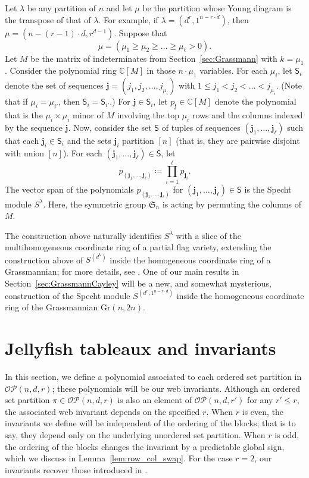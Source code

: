 \documentclass[ALCO, Unicode]{cedram}
\numberwithin{equation}{section}
\newcommand{\Gr}{\mathrm{Gr}}
\newcommand{\ordsetpart}{\mathcal{OP}}
\begin{document}
Let $\lambda$ be any partition of $n$ and let $\mu$ be the partition whose Young diagram is the transpose of that of $\lambda$. For example, if $\lambda = (d^r,1^{n - r \cdot d})$, then $\mu  = (n - (r-1) \cdot d, r^{d-1})$. Suppose that 
\[
\mu = (\mu_1 \geq \mu_2 \geq \dots \geq \mu_\ell > 0).
\]
Let $M$ be the matrix of indeterminates from Section~\ref{sec:Grassmann} with $k = \mu_1$. Consider the polynomial ring $\mathbb{C}[M]$ in those $n \cdot \mu_1$ variables. For each $\mu_i$, let $\mathsf{S}_i$ denote the set of sequences $\mathbf{j} = (j_1, j_2, \dots, j_{\mu_i})$ with $1 \leq j_1 < j_2 < \dots < j_{\mu_i}$. (Note that if $\mu_i = \mu_{i'}$, then $\mathsf{S}_i = \mathsf{S}_{i'}$.) For $\mathbf{j} \in \mathsf{S}_i$, let $p_{\mathbf{j}} \in \mathbb{C}[M]$ denote the polynomial that is the $\mu_i \times \mu_i$ minor of $M$ involving the top $\mu_i$ rows and the columns indexed by the sequence $\mathbf{j}$. Now, consider the set $\mathsf{S}$ of tuples of sequences $(\mathbf{j}_1, \dots, \mathbf{j}_\ell)$ such that each $\mathbf{j}_i \in \mathsf{S}_i$ and the sets $\mathbf{j}_i$ partition $[n]$ (that is, they are pairwise disjoint with union $[n]$).
For each $(\mathbf{j}_1, \dots, \mathbf{j}_\ell) \in \mathsf{S}$, let \[
p_{(\mathbf{j}_1, \dots, \mathbf{j}_\ell)} \coloneqq \prod_{i=1}^\ell p_{\mathbf{j}_i}.
\]
The vector span of the polynomials $p_{(\mathbf{j}_1, \dots, \mathbf{j}_\ell)}$ for $(\mathbf{j}_1, \dots, \mathbf{j}_\ell) \in \mathsf{S}$ is the Specht module $S^\lambda$. Here, the symmetric group $\mathfrak{S}_n$ is acting by permuting the columns of $M$.

The construction above naturally identifies $S^\lambda$ with a slice of the multihomogeneous coordinate ring of a partial flag variety, extending the construction above of $S^{(d^k)}$ inside the homogeneous coordinate ring of a Grassmannian; for more details, see \cite[\S2.3]{Patrias.Pechenik.Striker}.
One of our main results in Section~\ref{sec:GrassmannCayley} will be a new, and somewhat mysterious, construction of the Specht module $S^{(d^r,1^{n-r\cdot d})}$ inside the homogeneous coordinate ring of the Grassmannian $\Gr(n,2n)$.

\section{Jellyfish tableaux and  invariants}
\label{sec:invariants}
In this section, we define a polynomial associated to each ordered set partition in $\ordsetpart(n,d,r)$; these polynomials will be our web invariants. Although an ordered set partition $\pi \in \ordsetpart(n,d,r)$ is also an element of $\ordsetpart(n,d,r')$ for any $r' \leq r$, the associated web invariant depends on the specified $r$. When $r$ is even, the invariants we define will be independent of the ordering of the blocks; that is to say, they depend only on the underlying unordered set partition. When $r$ is odd, the ordering of the blocks changes the invariant by a predictable global sign, which we discuss in Lemma~\ref{lem:row_col_swap}. For the case $r=2$, our invariants recover those introduced in \cite{Patrias.Pechenik.Striker}.
\end{document}
